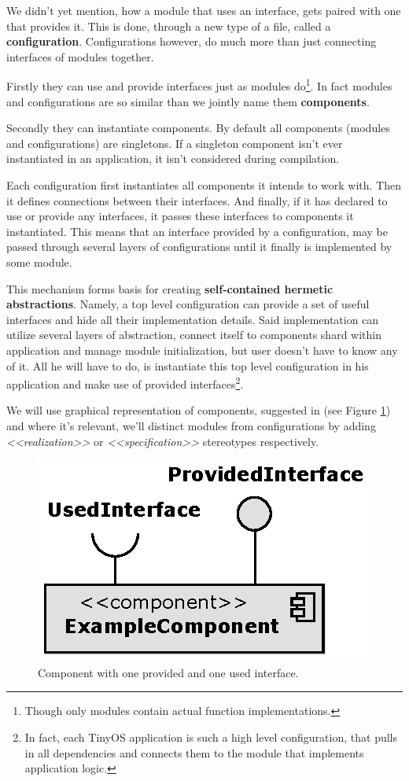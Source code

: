 We didn't yet mention, how a module that uses an interface, gets
paired with one that provides it. This is done, through a new type of
a file, called a {\bf configuration}. Configurations however, do much
more than just connecting interfaces of modules together.

Firstly they can use and provide interfaces just as modules
do\footnote{Though only modules contain actual function
implementations.}. In fact modules and configurations are so similar
than we jointly name them {\bf components}.

Secondly they can instantiate components. By default all components
(modules and configurations) are singletons. If a singleton component
isn't ever instantiated in an application, it isn't considered during
compilation.

Each configuration first instantiates all components it intends to
work with. Then it defines connections between their interfaces. And
finally, if it has declared to use or provide any interfaces, it passes
these interfaces to components it instantiated.  This means that an
interface provided by a configuration, may be passed through several
layers of configurations until it finally is implemented by some
module.

This mechanism forms basis for creating {\bf self-contained hermetic
abstractions}. Namely, a top level configuration can provide a set of
useful interfaces and hide all their implementation details. Said
implementation can utilize several layers of abstraction, connect
itself to components shard within application and manage module
initialization, but user doesn't have to know any of it. All he will
have to do, is instantiate this top level configuration in his
application and make use of provided interfaces\footnote{In fact, each
TinyOS application is such a high level configuration, that pulls in
all dependencies and connects them to the module that implements
application logic.}.

We will use graphical representation of components, suggested in
\cite{UML2ForTOS} (see Figure \ref{fig:example_component}) and where
it's relevant, we'll distinct modules from configurations by adding
\emph{<<realization>>} or \emph{<<specification>>} stereotypes
respectively.

\begin{figure}[h]
  \centering
  \includegraphics{diagrams/example_component.eps}
  \caption{Component with one provided and one used interface.}
  \label{fig:example_component}
\end{figure}

